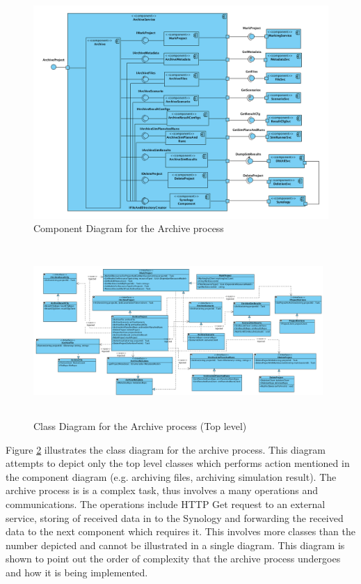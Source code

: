 \begin{figure}[H]
    \centering \includegraphics[scale=0.45]{grafiken/archiveComponent.png}
    \caption{Component Diagram for the Archive process}
    \label{fig:archiveComponent}
\end{figure}



\begin{figure}[H]
    \centering \includegraphics[height=6.5cm, angle=90, origin=c, width=11cm]{grafiken/archiveClass.png}
    \caption{Class Diagram for the Archive process (Top level)}
    \label{fig:archiveClassDiagram}
\end{figure}

Figure \ref{fig:archiveClassDiagram} illustrates the class diagram for the archive process. This diagram attempts to depict only the top level classes
which performs action mentioned in the component diagram (e.g. archiving files, archiving simulation result). The archive process is is a complex 
task, thus involves a many operations and communications. The operations include HTTP Get request to an external service, storing of received
data in to the Synology and forwarding the received data to the next component which requires it. This involves more classes than the number depicted
and cannot be illustrated in a single diagram. This diagram is shown to point out the order of complexity that the archive process undergoes and how it is being
implemented.

